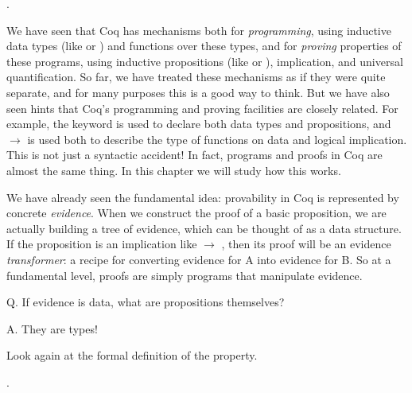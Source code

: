 \documentclass[12pt]{report}
\begin{document}
\begin{coqdoccode}
\coqdocemptyline
\coqdocnoindent
{}  .\coqdoceol
\coqdocemptyline
\coqdocemptyline
\end{coqdoccode}
 We have seen that Coq has mechanisms both for \textit{programming},
    using inductive data types (like  or ) and functions
    over these types, and for \textit{proving} properties of these programs,
    using inductive propositions (like  or ), implication, and 
    universal quantification.  So far, we have treated these mechanisms
    as if they were quite separate, and for many purposes this is
    a good way to think. But we have also seen hints that Coq's programming and 
    proving facilities are closely related. For example, the
    keyword  is used to declare both data types and 
    propositions, and \ensuremath{\rightarrow} is used both to describe the type of
    functions on data and logical implication. This is not just a
    syntactic accident!  In fact, programs and proofs in Coq are almost
    the same thing.  In this chapter we will study how this works.


    We have already seen the fundamental idea: provability in Coq is
    represented by concrete \textit{evidence}.  When we construct the proof
    of a basic proposition, we are actually building a tree of evidence, 
    which can be thought of as a data structure. If the proposition
    is an implication like  \ensuremath{\rightarrow} , then its proof will be an 
    evidence \textit{transformer}: a recipe for converting evidence for
    A into evidence for B.  So at a fundamental level, proofs are simply
    programs that manipulate evidence.


    Q. If evidence is data, what are propositions themselves?


    A. They are types!


    Look again at the formal definition of the  property.  \begin{coqdoccode}
\coqdocemptyline
\coqdocnoindent
{} .\coqdoceol
\coqdocemptyline
\end{coqdoccode}
\subsubsection{ }
\end{document}
